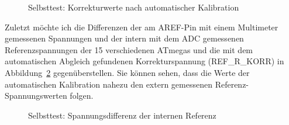 \begin{figure}[H]
  \centering
  \resizebox{9cm}{!}{}
  \caption{Selbsttest: Korrekturwerte nach automatischer Kalibration}
  \label{fig:SelfTrefKorr}
\end{figure}

Zuletzt möchte ich die Differenzen der am AREF-Pin mit einem Multimeter
gemessenen Spannungen und der intern mit dem ADC gemessenen Referenzspannungen der
15 verschiedenen ATmegas und die mit dem automatischen Abgleich
gefundenen Korrekturspannung (REF\_R\_KORR) in Abbildung~\ref{fig:SelfTrefDiff} gegenüberstellen.
Sie können sehen, dass die Werte der automatischen Kalibration nahezu den extern
gemessenen Referenz-Spannungswerten folgen.

\begin{figure}[H]
  \centering
  \resizebox{9cm}{!}{}
  \caption{Selbsttest: Spannungsdifferenz der internen Referenz}
  \label{fig:SelfTrefDiff}
\end{figure}


